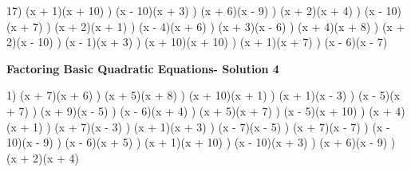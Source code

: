\documentclass{article}%
\begin{document}
17) (x + 1)(x + 10)%
) (x - 10)(x + 3)%
) (x + 6)(x - 9)%
) (x + 2)(x + 4)%
) (x - 10)(x + 7)%
) (x + 2)(x + 1)%
) (x - 4)(x + 6)%
) (x + 3)(x - 6)%
) (x + 4)(x + 8)%
) (x + 2)(x - 10)%
) (x - 1)(x + 3)%
) (x + 10)(x + 10)%
) (x + 1)(x + 7)%
) (x - 6)(x - 7)%
\newline%
\newpage%
\large%
\begin{center}%
\textbf{Factoring Basic Quadratic Equations- Solution 4}%
\newline%
\end{center} \normalsize%
1) (x + 7)(x + 6)%
) (x + 5)(x + 8)%
) (x + 10)(x + 1)%
) (x + 1)(x - 3)%
) (x - 5)(x + 7)%
) (x + 9)(x - 5)%
) (x - 6)(x + 4)%
) (x + 5)(x + 7)%
) (x - 5)(x + 10)%
) (x + 4)(x + 1)%
) (x + 7)(x - 3)%
) (x + 1)(x + 3)%
) (x - 7)(x - 5)%
) (x + 7)(x - 7)%
) (x - 10)(x - 9)%
) (x - 6)(x + 5)%
) (x + 1)(x + 10)%
) (x - 10)(x + 3)%
) (x + 6)(x - 9)%
) (x + 2)(x + 4)%
\newline%
\end{document}
